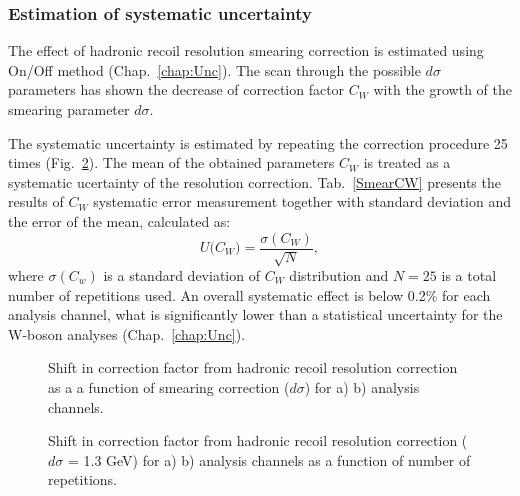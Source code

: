 \subsubsection{Estimation of systematic uncertainty}


The effect of hadronic recoil resolution smearing correction is estimated using On/Off method (Chap.~\ref{chap:Unc}). The scan through the possible $d\sigma$ parameters has shown the decrease of correction factor $C_W$ with the growth of the smearing parameter $d\sigma$. %

The systematic uncertainty is estimated by repeating the correction procedure 25 times (Fig.~\ref{ris:HadrRecSmearStab}). The mean of the obtained parameters $C_{W}$ is treated as a systematic ucertainty of the resolution correction. Tab.~\ref{SmearCW} presents the results of $C_{W}$ systematic error measurement together with standard deviation and the error of the mean, calculated as:
\begin{equation}\label{eq:MeanErr2}
U \Big( C_W \Big) = \frac{\sigma( C_{W} )}{\sqrt N},
\end{equation}
where $\sigma(C_w)$ is a standard deviation of $C_W$ distribution and $N=25$ is a total number of repetitions used. An overall systematic effect is below 0.2\% for each analysis channel, what is significantly lower than a statistical uncertainty for the W-boson analyses (Chap.~\ref{chap:Unc}).

\begin{figure}[!tbp]
\begin{minipage}[h]{0.49\linewidth}
\end{minipage}
\hfill
\begin{minipage}[h]{0.49\linewidth}
\end{minipage}
\caption{Shift in correction factor \cw from hadronic recoil resolution correction as a a function of smearing correction ($d\sigma$) for a) \wenu b) \wmunu analysis channels.}
\label{ris:HadrRecSmearScan}
\end{figure}

\begin{figure}[!tbp]
\begin{minipage}[h]{0.49\linewidth}
\end{minipage}
\hfill
\begin{minipage}[h]{0.49\linewidth}
\end{minipage}
\caption{Shift in correction factor \cw from hadronic recoil resolution correction ($d\sigma$ = 1.3 GeV) for a) \wenu b) \wmunu analysis channels as a function of number of repetitions.}
\label{ris:HadrRecSmearStab}
\end{figure}


